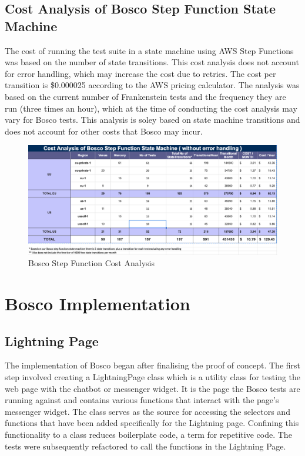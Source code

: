 \documentclass[12pt,a4paper,titlepage]{report}
\begin{document}
\clearpage
\section{Cost Analysis of Bosco Step Function State Machine}

The cost of running the test suite in a state machine using AWS Step Functions was based on the number of state transitions.\autocite{Amazon} 
This cost analysis does not account for error handling, which may increase the cost due to retries. The cost per transition is \$0.000025 according to the AWS pricing calculator. 
The analysis was based on the current number of Frankenstein tests and the frequency they are run (three times an hour), which at the time of conducting the cost analysis may vary for Bosco tests.
This analysis is soley based on state machine transitions and does not account for other costs that Bosco may incur.

\begin{figure}[H]
 \centering
 \includegraphics[width=15cm]{./diagrams/sfcost}
 \caption{Bosco Step Function Cost Analysis}
\end{figure}

\chapter{Bosco Implementation}
\section{Lightning Page}
The implementation of Bosco began after finalising the proof of concept. 
The first step involved creating a LightningPage class which is a utility class for testing the web page with the chatbot or messenger widget. 
It is the page the Bosco tests are running against and contains various functions that interact with the page's messenger widget. 
The class serves as the source for accessing the selectors and functions that have been added specifically for the Lightning page. 
Confining this functionality to a class reduces boilerplate code, a term for repetitive code. 
The tests were subsequently refactored to call the functions in the Lightning Page.
\end{document}
